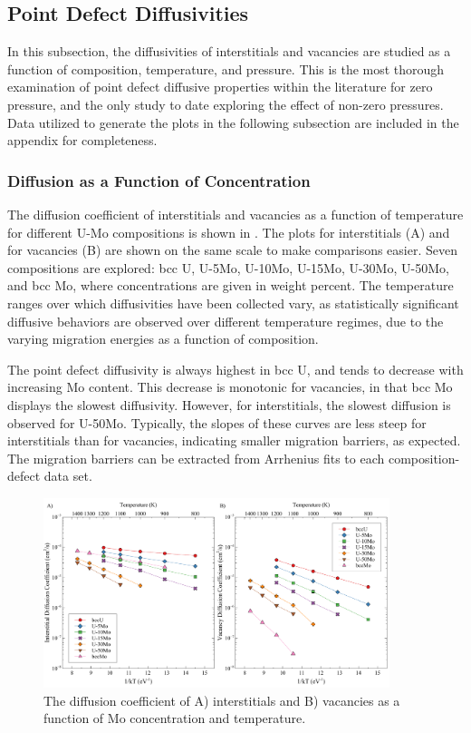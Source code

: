 \documentclass[review]{elsarticle}
\begin{document}
\subsection{Point Defect Diffusivities}

In this subsection, the diffusivities of interstitials and vacancies are studied as a function of composition, temperature, and pressure. This is the most thorough examination of point defect diffusive properties within the literature for zero pressure, and the only study to date exploring the effect of non-zero pressures. Data utilized to generate the plots in the following subsection are included in the appendix for completeness.

\subsubsection{Diffusion as a Function of Concentration}

The diffusion coefficient of interstitials and vacancies as a function of temperature for different U-Mo compositions is shown in . The plots for interstitials (A) and for vacancies (B) are shown on the same scale to make comparisons easier. Seven compositions are explored: bcc U, U-5Mo, U-10Mo, U-15Mo, U-30Mo, U-50Mo, and bcc Mo, where concentrations are given in weight percent. The temperature ranges over which diffusivities have been collected vary, as statistically significant diffusive behaviors are observed over different temperature regimes, due to the varying migration energies as a function of composition. 

The point defect diffusivity is always highest in bcc U, and tends to decrease with increasing Mo content. This decrease is monotonic for vacancies, in that bcc Mo displays the slowest diffusivity. However, for interstitials, the slowest diffusion is observed for U-50Mo. Typically, the slopes of these curves are less steep for interstitials than for vacancies, indicating smaller migration barriers, as expected. The migration barriers can be extracted from Arrhenius fits to each composition-defect data set. 

\begin{figure}[h!]
    \centering
    \includegraphics[width=0.9\textwidth]{diff_p0.pdf}
    \caption{The diffusion coefficient of A) interstitials and B) vacancies as a function of Mo concentration and temperature.}
    \label{fig:diff_p0}
\end{figure}
\end{document}
